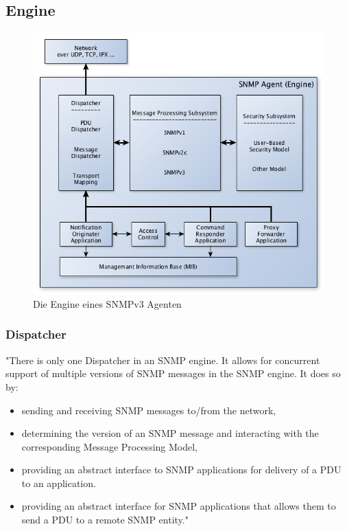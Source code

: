 \documentclass[11pt,a4paper]{article}
\begin{document}
\subsection{Engine}
\begin{figure}[h]
	\centering
	\includegraphics[scale=.6]{Bilder/SNMPv3-Engine-Agent.png}
	\caption{Die Engine eines SNMPv3 Agenten}
\end{figure}

\subsubsection{Dispatcher}
"There is only one Dispatcher in an SNMP engine.  It allows for concurrent support of multiple versions of SNMP messages in the SNMP engine. It does so by:
\begin{itemize}
	\item sending and receiving SNMP messages to/from the network,
	\item determining the version of an SNMP message and interacting with the corresponding Message Processing Model,
    \item providing an abstract interface to SNMP applications for delivery of a PDU to an application.
     \item providing an abstract interface for SNMP applications that allows them to send a PDU to a remote SNMP entity." \cite{rfcSnmpv3EngineDispatcher}
\end{itemize}
\end{document}
